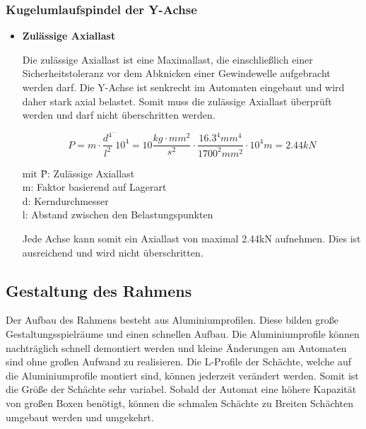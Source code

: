 \subsubsection{Kugelumlaufspindel der Y-Achse}


\begin{itemize}

\item \textbf{Zulässige Axiallast}

Die zulässige Axiallast ist eine Maximallast, die einschließlich einer Sicherheitstoleranz vor dem 	Abknicken einer Gewindewelle aufgebracht werden darf. Die Y-Achse ist senkrecht im Automaten eingebaut und wird daher stark axial belastet.
Somit muss die zulässige Axiallast überprüft werden und darf nicht überschritten werden.
	 		
\[P=m\cdot \dfrac{d^4}{l^2}^\cdot 10^4=10\dfrac{kg\cdot mm^2}{s^2}\cdot \dfrac{16.3^4mm^4}{1700^2mm^2}\cdot 10^4m=2.44kN\]


\begin{tabbing}
mit \=P: Zulässige Axiallast\\
		\>m: Faktor basierend auf Lagerart\\
		\>d: Kerndurchmesser\\
		\>l: Abstand zwischen den Belastungspunkten\\
\end{tabbing}

Jede Achse kann somit ein Axiallast von maximal 2.44kN aufnehmen. Dies ist ausreichend und wird nicht überschritten.


\end{itemize}








\subsection{Gestaltung des Rahmens}

Der Aufbau des Rahmens besteht aus Aluminiumprofilen. Diese bilden große Gestaltungsspielräume und einen schnellen Aufbau. Die Aluminiumprofile können nachträglich schnell demontiert werden und kleine Änderungen am Automaten sind ohne großen Aufwand zu realisieren. Die L-Profile der Schächte, welche auf die Aluminiumprofile montiert sind, können jederzeit verändert werden. Somit ist die Größe der Schächte sehr variabel. Sobald der Automat eine höhere Kapazität von großen Boxen benötigt, können die schmalen Schächte zu Breiten Schächten umgebaut werden und umgekehrt.\\


